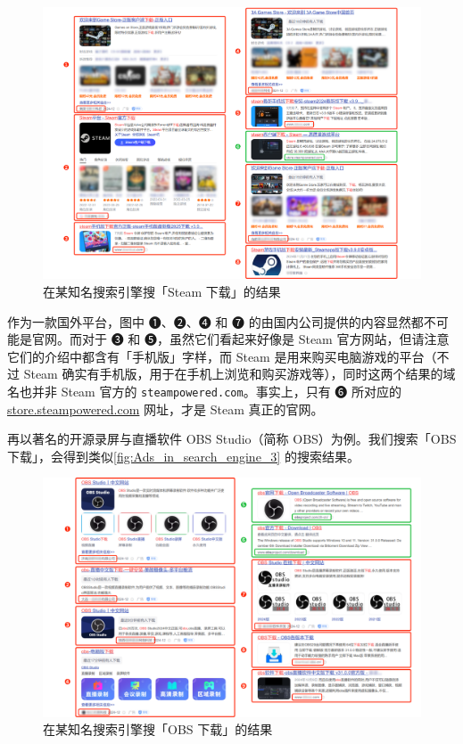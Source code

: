 \begin{figure}[htb!]
  \centering
  \includegraphics[width=.98\textwidth]{assets/basic/Ads_in_search_engine_2.pdf}
  \caption{在某知名搜索引擎搜「Steam 下载」的结果}
  \label{fig:Ads_in_search_engine_2}
\end{figure}

作为一款国外平台，图中 ➊、➋、➍ 和 ➐ 的由国内公司提供的内容显然都不可能是官网。而对于 ➌ 和 ➎，虽然它们看起来好像是 Steam 官方网站，但请注意它们的介绍中都含有「手机版」字样，而 Steam 是用来购买电脑游戏的平台（不过 Steam 确实有手机版，用于在手机上浏览和购买游戏等），同时这两个结果的域名也并非 Steam 官方的 \texttt{steampowered.com}。事实上，只有 ➏ 所对应的 \url{store.steampowered.com} 网址，才是 Steam 真正的官网。

再以著名的开源录屏与直播软件 OBS Studio（简称 OBS）为例。我们搜索「OBS 下载」，会得到类似\autoref{fig:Ads_in_search_engine_3} 的搜索结果。

\begin{figure}[htb!]
  \centering
  \includegraphics[width=.98\textwidth]{assets/basic/Ads_in_search_engine_3.pdf}
  \caption{在某知名搜索引擎搜「OBS 下载」的结果}
  \label{fig:Ads_in_search_engine_3}
\end{figure}

